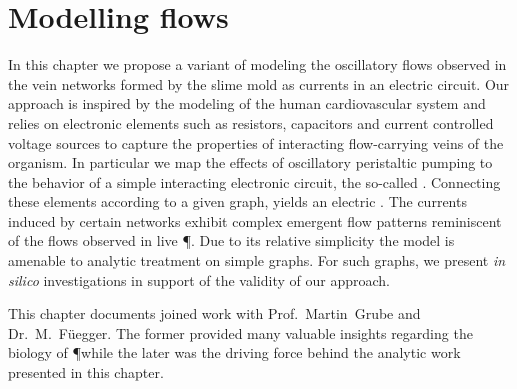 \chapter{Modelling flows}\label{chap:model}

	In this chapter we propose a variant of modeling the oscillatory flows observed in the vein networks formed by the slime mold \Pp as currents in an electric circuit. Our approach is inspired by the modeling of the human cardiovascular system and relies on electronic elements such as resistors, capacitors and current controlled voltage sources to capture the properties of interacting flow-carrying veins of the organism. In particular we map the effects of oscillatory peristaltic pumping to the behavior of a simple interacting electronic circuit, the so-called \Pe. Connecting these elements according to a given graph, yields an electric \Pn. The currents induced by certain networks exhibit complex emergent flow patterns reminiscent of the flows observed in live \P. Due to its relative simplicity the model is amenable to analytic treatment on simple graphs. For such graphs, we present \emph{in silico} investigations in support of the validity of our approach.

	This chapter documents joined work with Prof.~Martin~Grube and Dr.~M.~F\"uegger. The former provided many valuable insights regarding the biology of \P while the later was the driving force behind the analytic work presented in this chapter.

	
	
	
	
	
	

